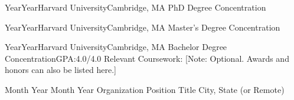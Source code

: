 \usepackage{blindtext}
\usepackage{lipsum}

\def\lrand{\lipsum[-]}
\def\firstname{Firstname}
\def\lastname{Lastname}
\def\preferredname{Preferredname}
\def\position{Software Development Engineer}

\def\phone{+1 (xxx) xxx-xxxx}
\def\email{youremail@college.harvard.edu}
\def\linkedin{linkedin.com/in/username}
\def\github{github.com/username}

\def\address{Current Address, USA}

\makeatletter
\if@publications
  
\fi
\makeatother

\def\profileSummary{
	\section{Career summary}
	\link{https://www.google.com/}{Google}
	\blindtext
}

{Year}{Year}{Harvard University}{Cambridge, MA}
{PhD Degree}
{Concentration}{}{}

{Year}{Year}{Harvard University}{Cambridge, MA}
{Master's Degree}
{Concentration}{}{}

{Year}{Year}{Harvard University}{Cambridge, MA}
{Bachelor Degree}
{Concentration}{GPA:4.0/4.0}
{Relevant Coursework: [Note: Optional. Awards and honors can also be listed here.]}

{Month Year}
{Month Year}
{Organization}
{Position Title}
{City, State (or Remote)}
{
	\begin{highlights}
	\end{highlights}
}


